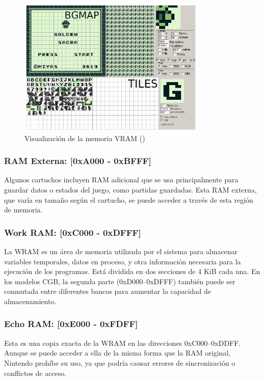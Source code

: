 \begin{figure}[H]
    \centering
    \includegraphics[width=0.8\textwidth]{include/images/mem_vram.png}
    \caption{Visualización de la memoria VRAM (\cite{goldensacra})}
    \label{figure:mem_vram}
\end{figure}

\subsubsection{RAM Externa: [0xA000 - 0xBFFF]}
Algunos cartuchos incluyen RAM adicional que se usa principalmente para guardar datos o estados del juego, como partidas guardadas. Esta RAM externa, que varía en tamaño según el cartucho, se puede acceder a través de esta región de memoria.

\subsubsection{Work RAM: [0xC000 - 0xDFFF]}
La WRAM es un área de memoria utilizada por el sistema para almacenar variables temporales, datos en proceso, y otra información necesaria para la ejecución de los programas. Está dividida en dos secciones de 4 KiB cada una. En los modelos CGB, la segunda parte (0xD000–0xDFFF) también puede ser conmutada entre diferentes bancos para aumentar la capacidad de almacenamiento.

\subsubsection{Echo RAM: [0xE000 - 0xFDFF]}
Esta es una copia exacta de la WRAM en las direcciones 0xC000–0xDDFF. Aunque se puede acceder a ella de la misma forma que la RAM original, Nintendo prohíbe su uso, ya que podría causar errores de sincronización o conflictos de acceso.

